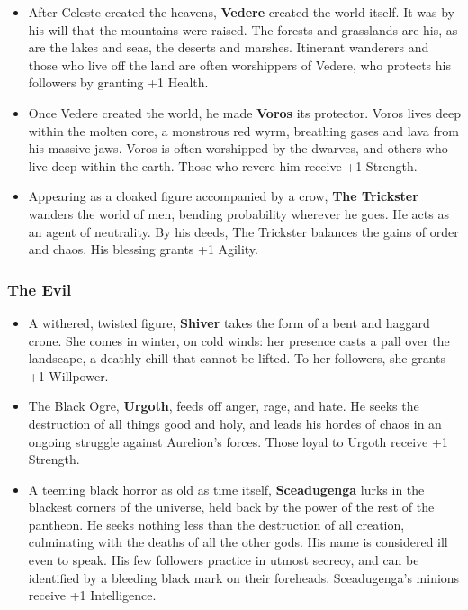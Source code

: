 \begin{itemize}
\item After Celeste created the heavens, {\bf Vedere} created the world 
itself.  It was by his will that the mountains were raised.  The forests 
and grasslands are his, as are the lakes and seas, the deserts and 
marshes.  Itinerant wanderers and those who live off the land are often 
worshippers of Vedere, who protects his followers by granting +1 Health.

\item Once Vedere created the world, he made {\bf Voros} its protector.  
Voros lives deep within the molten core, a monstrous red wyrm, breathing 
gases and lava from his massive jaws.  Voros is often worshipped by the 
dwarves, and others who live deep within the earth.  Those who revere him 
receive +1 Strength.

\item Appearing as a cloaked figure accompanied by a crow, 
{\bf The Trickster} wanders the world of men, bending probability wherever 
he goes.  He acts as an agent of neutrality.  By his deeds, The Trickster 
balances the gains of order and chaos.  His blessing grants +1 Agility.
\end{itemize}

\subsubsection{The Evil}

\begin{itemize}
\item A withered, twisted figure, {\bf Shiver} takes the form of a bent and
haggard crone.  She comes in winter, on cold winds: her presence casts a 
pall over the landscape, a deathly chill that cannot be lifted.  To her 
followers, she grants +1 Willpower. 

\item The Black Ogre, {\bf Urgoth}, feeds off anger, rage, and hate.  He 
seeks the destruction of all things good and holy, and leads his hordes of 
chaos in an ongoing struggle against Aurelion's forces.  Those loyal to 
Urgoth receive +1 Strength.

\item A teeming black horror as old as time itself, {\bf Sceadugenga} lurks
in the blackest corners of the universe, held back by the power of the rest
of the pantheon.  He seeks nothing less than the destruction of all 
creation, culminating with the deaths of all the other gods.  His name is 
considered ill even to speak.  His few followers practice in utmost 
secrecy, and can be identified by a bleeding black mark on their 
foreheads.  Sceadugenga's minions receive +1 Intelligence.

\end{itemize}

